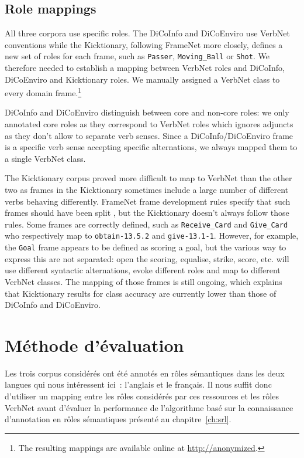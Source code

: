 \subsection{Role mappings}

All three corpora use specific roles. The DiCoInfo and DiCoEnviro use VerbNet
conventions while the Kicktionary, following FrameNet more closely, defines a
new set of roles for each frame, such as \texttt{Passer}, \texttt{Moving\_Ball}
or \texttt{Shot}. We therefore needed to establish a mapping between VerbNet
roles and DiCoInfo, DiCoEnviro and Kicktionary roles. We manually assigned a
VerbNet class to every domain frame.\footnote{The resulting mappings are
available online at \url{http://anonymized}.}

DiCoInfo and DiCoEnviro distinguish between core and non-core roles: we only
annotated core roles as they correspond to VerbNet roles which ignores adjuncts
as they don't allow to separate verb senses. Since a DiCoInfo/DiCoEnviro frame
is a specific verb sense accepting specific alternations, we always mapped them
to a single VerbNet class.

The Kicktionary corpus proved more difficult to map to VerbNet than the other
two as frames in the Kicktionary sometimes include a large number of different
verbs behaving differently. FrameNet frame development rules specify that such
frames should have been split \cite{ruppenhofer2006extended}, but the
Kicktionary doesn't always follow those rules. Some frames are correctly
defined, such as \texttt{Receive\_Card} and \texttt{Give\_Card} who
respectively map to \texttt{obtain-13.5.2} and \texttt{give-13.1-1}. However,
for example, the \texttt{Goal} frame appears to be defined as scoring a goal,
but the various way to express this are not separated: open the scoring,
equalise, strike, score, etc. will use different syntactic alternations, evoke
different roles and map to different VerbNet classes. The mapping of those
frames is still ongoing, which explains that Kicktionary results for class
accuracy are currently lower than those of DiCoInfo and DiCoEnviro.

\section{Méthode d'évaluation}

Les trois corpus considérés ont été annotés en rôles sémantiques dans les deux
langues qui nous intéressent ici~: l'anglais et le français. Il nous suffit
donc d'utiliser un mapping entre les rôles considérés par ces ressources et les
rôles VerbNet avant d'évaluer la performance de l'algorithme basé sur la
connaissance d'annotation en rôles sémantiques présenté au
chapitre~\ref{ch:srl}.

